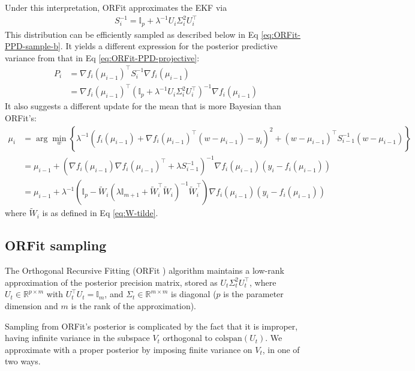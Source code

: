 Under this interpretation, ORFit approximates the EKF via
\begin{align}
    S_{i}^{-1}=\mathbb{I}_{p}+\lambda^{-1}U_{i}\Sigma_{i}^{2}U_{i}^{\top}
\end{align}
This distribution can be efficiently sampled as described below in Eq \eqref{eq:ORFit-PPD-sample-b}.
It yields a different expression for the posterior predictive variance from that in Eq \eqref{eq:ORFit-PPD-projective}:
\begin{align}
P_{i}	&=\nabla f_{i}\left(\mu_{i-1}\right)^{\top}S_{i}^{-1}\nabla f_{i}\left(\mu_{i-1}\right) \\
	&=\nabla f_{i}\left(\mu_{i-1}\right)^{\top}\left(\mathbb{I}_{p}+\lambda^{-1}U_{i}\Sigma_{i}^{2}U_{i}^{\top}\right)^{-1}\nabla f_{i}\left(\mu_{i-1}\right)
 \end{align} 
It also suggests a different update for the mean that is more Bayesian than ORFit's: 
\begin{align}
    \mu_{i}	&=\arg\min_{w}\left\{\lambda^{-1}\left(f_{i}\left(\mu_{i-1}\right)+\nabla f_{i}\left(\mu_{i-1}\right)^{\top}\left(w-\mu_{i-1}\right)-y_{i}\right)^{2}+\left(w-\mu_{i-1}\right)^{\top}S_{i-1}^{-1}\left(w-\mu_{i-1}\right)\right\} \\
    &=\mu_{i-1}+\left(\nabla f_{i}\left(\mu_{i-1}\right)\nabla f_{i}\left(\mu_{i-1}\right)^{\top}+\lambda S_{i-1}^{-1}\right)^{-1}\nabla f_{i}\left(\mu_{i-1}\right)\left(y_{i}-f_{i}\left(\mu_{i-1}\right)\right) \\
    &= \mu_{i-1} + \lambda^{-1}\left(\mathbb{I}_p - \tilde{W}_i\left(\lambda\mathbb{I}_{m+1}+\tilde{W}_i^{\top}\tilde{W}_i\right)^{-1}\tilde{W}_i^{\top}\right) \nabla f_{i}\left(\mu_{i-1}\right)\left(y_{i}-f_{i}\left(\mu_{i-1}\right)\right)
\end{align}
where $\tilde{W}_i$ is as defined in Eq \eqref{eq:W-tilde}.

\subsection{ORFit sampling}

The Orthogonal Recursive Fitting (ORFit \cite{ORFit}) algorithm maintains a low-rank approximation of the posterior precision matrix, stored as $U_t\Sigma_t^2 U_t^{\top}$, where $U_t\in\mathbb{R}^{p\times m}$ with $U_t^{\top} U_t=\mathbb{I}_m$, and $\Sigma_t\in\mathbb{R}^{m\times m}$ is diagonal ($p$ is the parameter dimension and $m$ is the rank of the approximation).

Sampling from ORFit's posterior is complicated by the fact that it is improper, having infinite variance in the subspace $V_t$ orthogonal to $\text{colspan}(U_t)$. We approximate with a proper posterior by imposing finite variance on $V_t$, in one of two ways.

